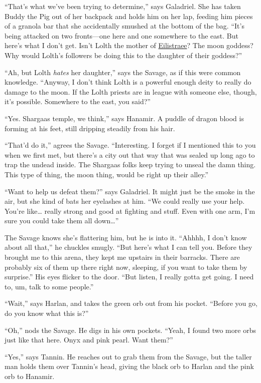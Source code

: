 \documentclass[smalldemyvopaper,11pt,twoside,onecolumn,openright,extrafontsizes]{memoir}
\begin{document}
``That's what we've been trying to determine,'' says Galadriel. She has
taken Buddy the Pig out of her backpack and holds him on her lap,
feeding him pieces of a granola bar that she accidentally smushed at the
bottom of the bag. ``It's being attacked on two fronts---one here and
one somewhere to the east. But here's what I don't get. Isn't Lolth the
mother of \href{/characters/eilistraee/}{Eilistraee}? The moon goddess?
Why would Lolth's followers be doing this to the daughter of their
goddess?''

``Ah, but Lolth \emph{hates} her daughter,'' says the Savage, as if this
were common knowledge. ``Anyway, I don't think Lolth is a powerful
enough deity to really do damage to the moon. If the Lolth priests are
in league with someone else, though, it's possible. Somewhere to the
east, you said?''

``Yes. Shargaas temple, we think,'' says Hanamir. A puddle of dragon
blood is forming at his feet, still dripping steadily from his hair.

``That'd do it,'' agrees the Savage. ``Interesting. I forget if I
mentioned this to you when we first met, but there's a city out that way
that was sealed up long ago to trap the undead inside. The Shargaas
folks keep trying to unseal the damn thing. This type of thing, the moon
thing, would be right up their alley.''

``Want to help us defeat them?'' says Galadriel. It might just be the
smoke in the air, but she kind of bats her eyelashes at him. ``We could
really use your help. You're like\ldots{} really strong and good at
fighting and stuff. Even with one arm, I'm sure you could take them all
down\ldots{}''

The Savage knows she's flattering him, but he is into it. ``Ahhhh, I
don't know about all that,'' he chuckles smugly. ``But here's what I can
tell you. Before they brought me to this arena, they kept me upstairs in
their barracks. There are probably six of them up there right now,
sleeping, if you want to take them by surprise.'' His eyes flicker to
the door. ``But listen, I really gotta get going. I need to, um, talk to
some people.''

``Wait,'' says Harlan, and takes the green orb out from his pocket.
``Before you go, do you know what this is?''

``Oh,'' nods the Savage. He digs in his own pockets. ``Yeah, I found two
more orbs just like that here. Onyx and pink pearl. Want them?''

``Yes,'' says Tannin. He reaches out to grab them from the Savage, but
the taller man holds them over Tannin's head, giving the black orb to
Harlan and the pink orb to Hanamir.
\end{document}
